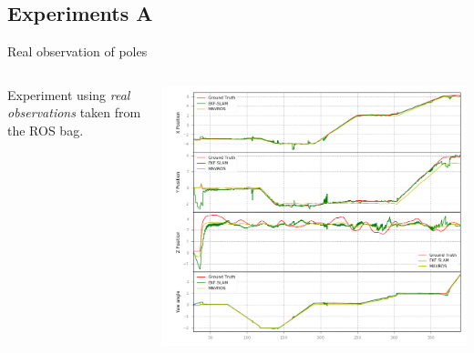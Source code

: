\documentclass[serif,aspectratio=169]{beamer}
\begin{document}
    \subsection{Experiments A}
    \begin{frame}{Real observation of poles}
        \begin{columns}[c]
            \begin{column}{.5\textwidth}
                Experiment using \emph{real observations} taken from the ROS bag.
            \end{column}
            \begin{column}{.5\textwidth}
                \centering
                \includegraphics[height=0.8\textheight]{Images/fig20-exp-a2.png}
            \end{column}
        \end{columns}

    \end{frame}
\end{document}
